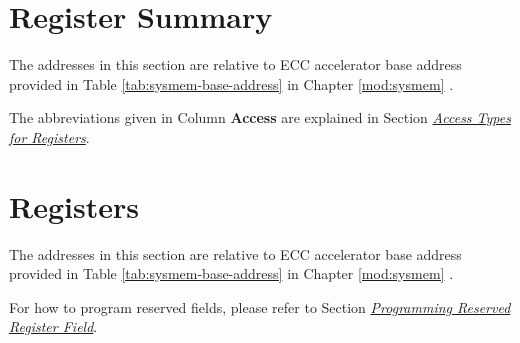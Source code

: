 \documentclass[main\_\_EN.tex]{subfiles}
\begin{document}



\newpage
\hypertarget{ecc-reg-summ}{}
\section{Register Summary}
\label{sec:ecc-reg-summ}

The addresses in this section are relative to ECC accelerator base address provided in Table \ref{tab:sysmem-base-address} in Chapter \ref{mod:sysmem} \textit{}.

The abbreviations given in Column \textbf{Access} are explained in Section \hyperref[glossary-access-types]{\textit{Access Types for Registers}}.






\newpage
\section{Registers}

The addresses in this section are relative to ECC accelerator base address provided in Table \ref{tab:sysmem-base-address} in Chapter \ref{mod:sysmem} \textit{}.

For how to program reserved fields, please refer to Section \hyperref[programming-reserved-field]{\textit{Programming Reserved Register Field}}.


\end{document}
